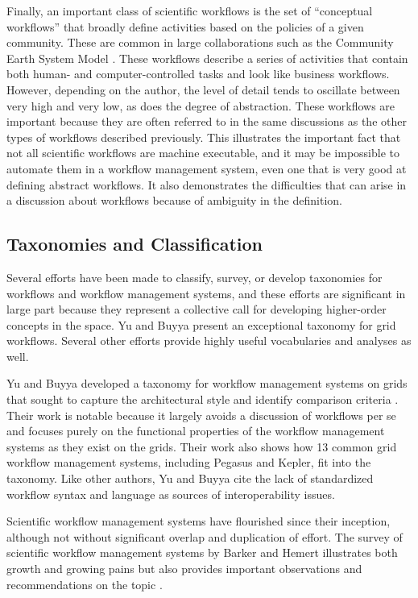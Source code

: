 Finally, an important class of scientific workflows is the set of ``conceptual
workflows'' that broadly define activities based on the policies of a given
community. These are common in large collaborations such as the Community Earth
System Model \cite{noauthor_cesm_nodate}. These workflows describe a
series of activities that contain both human- and computer-controlled tasks
and look like business workflows. However, depending on the author, the level
of detail tends to oscillate between very high and very low, as does the degree
of abstraction. These workflows are important because they are often referred
to in the same discussions as the other types of workflows described previously.
This illustrates the important fact that not all scientific workflows are
machine executable, and it may be impossible to automate them in a workflow
management system, even one that is very good at defining abstract workflows.
It also demonstrates the difficulties that can arise in a discussion about
workflows because of ambiguity in the definition.

\subsection{Taxonomies and Classification}\label{taxonomies-and-classification}
Several efforts have been made to classify, survey, or develop taxonomies for
workflows and workflow management systems, and these efforts are significant in
large part because they represent a collective call for developing higher-order
concepts in the space. Yu and Buyya present an exceptional taxonomy for grid
workflows. Several other efforts provide highly useful vocabularies and
analyses as well.

Yu and Buyya developed a taxonomy for workflow management systems on grids that
sought to capture the architectural style and identify comparison criteria
\cite{yu_taxonomy_2005}. Their work is notable because it largely avoids a
discussion of workflows per se and focuses purely on the functional
properties of the workflow management systems as they exist on the grids. Their
work also shows how 13 common grid workflow management systems, including
Pegasus and Kepler, fit into the taxonomy. Like other authors, Yu and Buyya
cite the lack of standardized workflow syntax and language as sources of
interoperability issues.

Scientific workflow management systems have flourished since their inception,
although not without significant overlap and duplication of effort. The survey
of scientific workflow management systems by Barker and Hemert illustrates both
growth and growing pains but also provides important observations and
recommendations on the topic \cite{barker_scientific_2007}.

